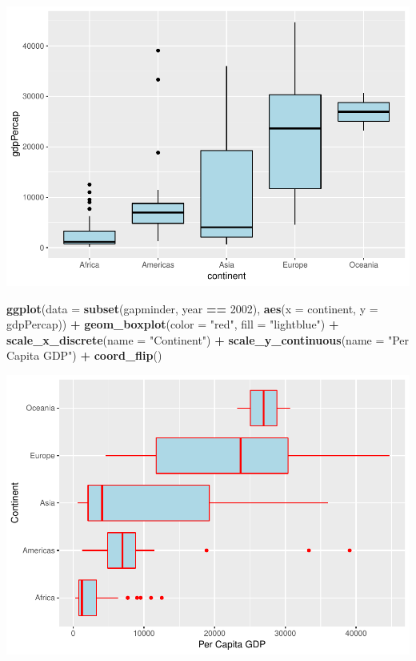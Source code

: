 \documentclass[]{article}
\newenvironment{Shaded}{\begin{snugshade}}{\end{snugshade}}
\newcommand{\KeywordTok}[1]{\textcolor[rgb]{0.13,0.29,0.53}{\textbf{#1}}}
\newcommand{\DataTypeTok}[1]{\textcolor[rgb]{0.13,0.29,0.53}{#1}}
\newcommand{\DecValTok}[1]{\textcolor[rgb]{0.00,0.00,0.81}{#1}}
\newcommand{\StringTok}[1]{\textcolor[rgb]{0.31,0.60,0.02}{#1}}
\newcommand{\OperatorTok}[1]{\textcolor[rgb]{0.81,0.36,0.00}{\textbf{#1}}}
\newcommand{\NormalTok}[1]{#1}
\begin{document}
\includegraphics{stt-301-programming_files/figure-latex/unnamed-chunk-69-1.pdf}

\begin{Shaded}
\begin{Highlighting}[]
\KeywordTok{ggplot}\NormalTok{(}\DataTypeTok{data =} \KeywordTok{subset}\NormalTok{(gapminder, year }\OperatorTok{==}\StringTok{ }\DecValTok{2002}\NormalTok{),}
    \KeywordTok{aes}\NormalTok{(}\DataTypeTok{x =}\NormalTok{ continent, }\DataTypeTok{y =}\NormalTok{ gdpPercap)) }\OperatorTok{+}
\StringTok{  }\KeywordTok{geom_boxplot}\NormalTok{(}\DataTypeTok{color =} \StringTok{"red"}\NormalTok{, }\DataTypeTok{fill =} \StringTok{"lightblue"}\NormalTok{) }\OperatorTok{+}
\StringTok{  }\KeywordTok{scale_x_discrete}\NormalTok{(}\DataTypeTok{name =} \StringTok{"Continent"}\NormalTok{) }\OperatorTok{+}
\StringTok{  }\KeywordTok{scale_y_continuous}\NormalTok{(}\DataTypeTok{name =} \StringTok{"Per Capita GDP"}\NormalTok{) }\OperatorTok{+}\StringTok{ }\KeywordTok{coord_flip}\NormalTok{()}
\end{Highlighting}
\end{Shaded}

\includegraphics{stt-301-programming_files/figure-latex/unnamed-chunk-70-1.pdf}
\end{document}
